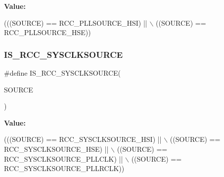 {\bfseries Value\+:}
\begin{DoxyCode}
(((SOURCE) == RCC\_PLLSOURCE\_HSI) || \(\backslash\)
                                  ((SOURCE) == RCC\_PLLSOURCE\_HSE))
\end{DoxyCode}
\mbox{\label{group___r_c_c___i_s___r_c_c___definitions_ga0797bfc445903525324cbd06a6cebbd2}} 
\subsubsection{\texorpdfstring{I\+S\+\_\+\+R\+C\+C\+\_\+\+S\+Y\+S\+C\+L\+K\+S\+O\+U\+R\+CE}{IS\_RCC\_SYSCLKSOURCE}}
{\footnotesize\ttfamily \#define I\+S\+\_\+\+R\+C\+C\+\_\+\+S\+Y\+S\+C\+L\+K\+S\+O\+U\+R\+CE(\begin{DoxyParamCaption}\item[{}]{S\+O\+U\+R\+CE }\end{DoxyParamCaption})}

{\bfseries Value\+:}
\begin{DoxyCode}
(((SOURCE) == RCC\_SYSCLKSOURCE\_HSI) || \(\backslash\)
                                     ((SOURCE) == RCC\_SYSCLKSOURCE\_HSE) || \(\backslash\)
                                     ((SOURCE) == RCC\_SYSCLKSOURCE\_PLLCLK) || \(\backslash\)
                                     ((SOURCE) == RCC\_SYSCLKSOURCE\_PLLRCLK))
\end{DoxyCode}
